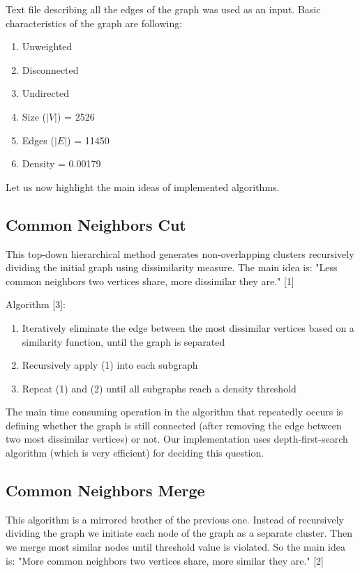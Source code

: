 \documentclass[journal]{IEEEtran}
\begin{document}
Text file describing all the edges of the graph was used as an input. Basic characteristics of the graph are following:
\begin{enumerate}
	\item Unweighted
	\item Disconnected 
	\item Undirected
	\item Size ($|V|$) = 2526
	\item Edges ($|E|$) = 11450
	\item Density = 0.00179
\end{enumerate}

Let us now highlight the main ideas of implemented algorithms.

\subsection{Common Neighbors Cut}
This top-down hierarchical method generates non-overlapping clusters recursively dividing the initial graph using dissimilarity measure. The main idea is: "Less common neighbors two vertices share, more dissimilar they are." [1]

Algorithm [3]:
\begin{enumerate}
	\item Iteratively eliminate the edge between the most dissimilar vertices
	based on a similarity function, until the graph is separated
	\item Recursively apply (1) into each subgraph
	\item Repeat (1) and (2) until all subgraphs reach a density threshold
\end{enumerate}

The main time consuming operation in the algorithm that repeatedly occurs is defining whether the graph is still connected (after removing the edge between two most dissimilar vertices) or not. Our implementation uses depth-first-search algorithm (which is very efficient) for deciding this question. 

\subsection{Common Neighbors Merge}
This algorithm is a mirrored brother of the previous one. Instead of recursively dividing the graph we initiate each node of the graph as a separate cluster. Then we merge most similar nodes until threshold value is violated. So the main idea is: "More common neighbors two vertices share, more similar they are." [2]
\end{document}
